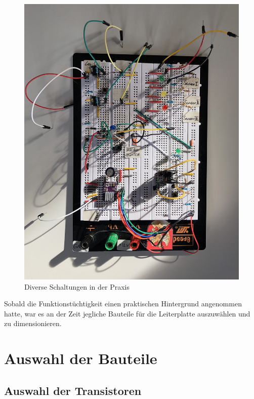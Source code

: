 \begin{figure}[hb]
    \centering
    \includegraphics[scale=0.08]{fig/elektro/Steckbrett}
    \caption{Diverse Schaltungen in der Praxis}
\end{figure}

Sobald die Funktionstüchtigkeit einen praktischen Hintergrund angenommen hatte,
war es an der Zeit jegliche Bauteile für die Leiterplatte auszuwählen und zu dimensionieren.


\newpage
\section{Auswahl der Bauteile}

\subsection{Auswahl der Transistoren}
